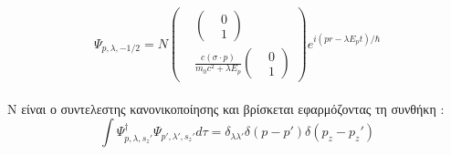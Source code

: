 \begin{equation*} 
  \Psi_{p,\lambda,-1/2} =N 
  \begin{pmatrix}
    &\begin{pmatrix} &0 \\ &1 \end{pmatrix}\\
    &\frac{c(\sigma \cdot p )}{m_0 c^2 + \lambda E_p}\begin{pmatrix} &0 \\ &1 \end{pmatrix}
  \end{pmatrix}
  e^{i(pr-\lambda E_p t)/\hbar}
\end{equation*}\\
Ν είναι ο συντελεστης κανονικοποίησης και βρίσκεται εφαρμόζοντας τη συνθήκη :\\ 
\[ \int \Psi_{p, \lambda,s_z'}^{\dagger} \Psi_{p', \lambda',s_z'} d\tau=\delta_{\lambda \lambda'} \delta(p-p')\delta(p_z-p_z') \]\\
